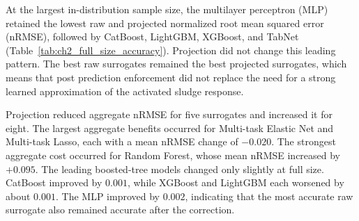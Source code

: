 \documentclass[12pt, twoside]{book}
\begin{document}
At the largest in-distribution sample size, the multilayer perceptron (MLP) retained the lowest raw and
projected normalized root mean squared error (nRMSE), followed by CatBoost, LightGBM, XGBoost, and TabNet
(Table~\ref{tab:ch2_full_size_accuracy}). Projection did not change this leading pattern. The best raw
surrogates remained the best projected surrogates, which means that post prediction enforcement did not replace
the need for a strong learned approximation of the activated sludge response.

Projection reduced aggregate nRMSE for five surrogates and increased it for eight. The largest aggregate
benefits occurred for Multi-task Elastic Net and Multi-task Lasso, each with a mean nRMSE change of \(-0.020\).
The strongest aggregate cost occurred for Random Forest, whose mean nRMSE increased by \(+0.095\). The leading
boosted-tree models changed only slightly at full size. CatBoost improved by \(0.001\), while XGBoost and
LightGBM each worsened by about \(0.001\). The MLP improved by \(0.002\), indicating that the most accurate raw
surrogate also remained accurate after the correction.
\end{document}
